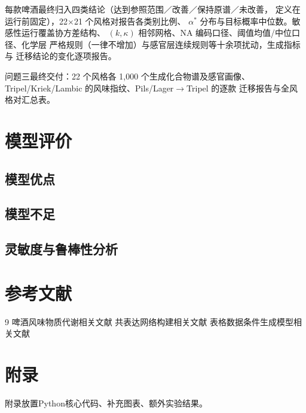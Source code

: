 \documentclass[12pt,a4paper]{article}
\begin{document}
每款啤酒最终归入四类结论（达到参照范围／改善／保持原谱／未改善，
定义在运行前固定），22$\times$21 个风格对报告各类别比例、
$\alpha^*$ 分布与目标概率中位数。敏感性运行覆盖协方差结构、
$(k,\kappa)$ 相邻网格、NA 编码口径、阈值均值/中位口径、化学层
严格规则（一律不增加）与感官层连续规则等十余项扰动，生成指标与
迁移结论的变化逐项报告。

问题三最终交付：22 个风格各 1{,}000 个生成化合物谱及感官画像、
Tripel/Kriek/Lambic 的风味指纹、Pils/Lager$\to$Tripel 的逐款
迁移报告与全风格对汇总表。
\section{模型评价}
\subsection{模型优点}
\subsection{模型不足}
\subsection{灵敏度与鲁棒性分析}

\section{参考文献}
\begin{thebibliography}{9}
 啤酒风味物质代谢相关文献
 共表达网络构建相关文献
 表格数据条件生成模型相关文献
\end{thebibliography}

\section{附录}
附录放置Python核心代码、补充图表、额外实验结果。
\end{document}
